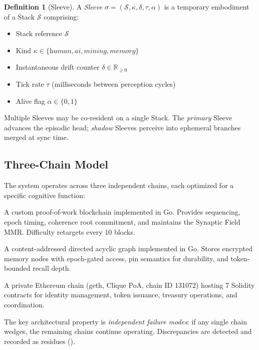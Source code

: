 \documentclass[11pt,twocolumn]{article}
\theoremstyle{definition}
\newtheorem{definition}{Definition}[section]
\theoremstyle{plain}
\theoremstyle{remark}
\newcommand{\R}{\mathbb{R}}
\begin{document}
\begin{definition}[Sleeve]\label{def:sleeve}
A \emph{Sleeve} $\sigma = (\mathcal{S}, \kappa, \delta, \tau, \alpha)$ is a temporary embodiment of a Stack $\mathcal{S}$ comprising:
\begin{itemize}[leftmargin=*,itemsep=1pt]
  \item Stack reference $\mathcal{S}$
  \item Kind $\kappa \in \{\textit{human}, \textit{ai}, \textit{mining}, \textit{memory}\}$
  \item Instantaneous drift counter $\delta \in \R_{\geq 0}$
  \item Tick rate $\tau$ (milliseconds between perception cycles)
  \item Alive flag $\alpha \in \{0,1\}$
\end{itemize}
Multiple Sleeves may be co-resident on a single Stack. The \emph{primary} Sleeve advances the episodic head; \emph{shadow} Sleeves perceive into ephemeral branches merged at sync time.
\end{definition}

\subsection{Three-Chain Model}

The system operates across three independent chains, each optimized for a specific cognitive function:

\begin{description}[leftmargin=*,style=nextline]
  \item[Medulla PoW (L1a)] A custom proof-of-work blockchain implemented in Go. Provides sequencing, epoch timing, coherence root commitment, and maintains the Synaptic Field MMR. Difficulty retargets every 10 blocks.
  \item[Hippocampus DAG (L1b)] A content-addressed directed acyclic graph implemented in Go. Stores encrypted memory nodes with epoch-gated access, pin semantics for durability, and token-bounded recall depth.
  \item[Cortex EVM (L1c)] A private Ethereum chain (geth, Clique PoA, chain ID 131072) hosting 7 Solidity contracts for identity management, token issuance, treasury operations, and coordination.
\end{description}

The key architectural property is \emph{independent failure modes}: if any single chain wedges, the remaining chains continue operating. Discrepancies are detected and recorded as residues ().
\end{document}
